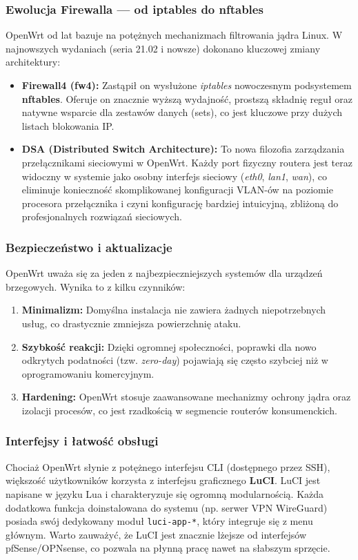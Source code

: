 \documentclass[12pt,a4paper]{article}
\begin{document}
\subsubsection{Ewolucja Firewalla --- od iptables do nftables}
OpenWrt od lat bazuje na potężnych mechanizmach filtrowania jądra Linux. W najnowszych wydaniach (seria 21.02 i nowsze) dokonano kluczowej zmiany architektury:
\begin{itemize}
	\item \textbf{Firewall4 (fw4):} Zastąpił on wysłużone \textit{iptables} nowoczesnym podsystemem \textbf{nftables}. Oferuje on znacznie wyższą wydajność, prostszą składnię reguł oraz natywne wsparcie dla zestawów danych (sets), co jest kluczowe przy dużych listach blokowania IP.
	\item \textbf{DSA (Distributed Switch Architecture):} To nowa filozofia zarządzania przełącznikami sieciowymi w OpenWrt. Każdy port fizyczny routera jest teraz widoczny w systemie jako osobny interfejs sieciowy (\textit{eth0}, \textit{lan1}, \textit{wan}), co eliminuje konieczność skomplikowanej konfiguracji VLAN-ów na poziomie procesora przełącznika i czyni konfigurację bardziej intuicyjną, zbliżoną do profesjonalnych rozwiązań sieciowych.
\end{itemize}

\subsubsection{Bezpieczeństwo i aktualizacje}
OpenWrt uważa się za jeden z najbezpieczniejszych systemów dla urządzeń brzegowych. Wynika to z kilku czynników:
\begin{enumerate}
	\item \textbf{Minimalizm:} Domyślna instalacja nie zawiera żadnych niepotrzebnych usług, co drastycznie zmniejsza powierzchnię ataku.
	\item \textbf{Szybkość reakcji:} Dzięki ogromnej społeczności, poprawki dla nowo odkrytych podatności (tzw. \textit{zero-day}) pojawiają się często szybciej niż w oprogramowaniu komercyjnym.
	\item \textbf{Hardening:} OpenWrt stosuje zaawansowane mechanizmy ochrony jądra oraz izolacji procesów, co jest rzadkością w segmencie routerów konsumenckich.
\end{enumerate}

\subsubsection{Interfejsy i łatwość obsługi}
Chociaż OpenWrt słynie z potężnego interfejsu CLI (dostępnego przez SSH), większość użytkowników korzysta z interfejsu graficznego \textbf{LuCI}. LuCI jest napisane w języku Lua i charakteryzuje się ogromną modularnością. Każda dodatkowa funkcja doinstalowana do systemu (np. serwer VPN WireGuard) posiada swój dedykowany moduł \texttt{luci-app-*}, który integruje się z menu głównym. Warto zauważyć, że LuCI jest znacznie lżejsze od interfejsów pfSense/OPNsense, co pozwala na płynną pracę nawet na słabszym sprzęcie.
\end{document}
